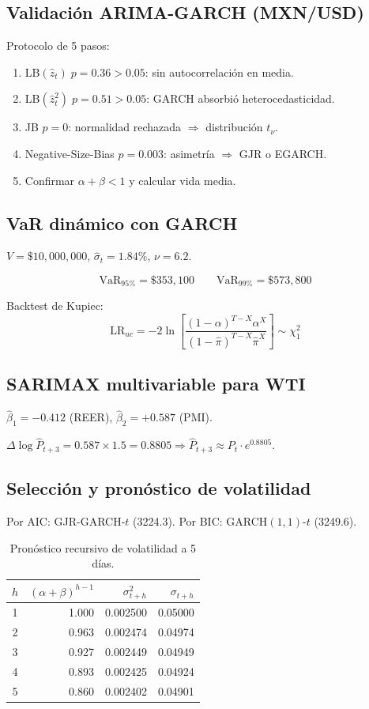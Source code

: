 \documentclass[12pt,letterpaper]{article}
\begin{document}
\subsection{Validaci\'on ARIMA-GARCH (MXN/USD)}

Protocolo de 5 pasos:
\begin{enumerate}
  \item LB$(\hat{z}_t)\;p=0.36>0.05$: sin autocorrelaci\'on en media.
  \item LB$(\hat{z}_t^2)\;p=0.51>0.05$: GARCH absorbi\'o heterocedasticidad.
  \item JB $p=0$: normalidad rechazada $\Rightarrow$ distribuci\'on $t_\nu$.
  \item Negative-Size-Bias $p=0.003$: asimetr\'ia $\Rightarrow$ GJR o EGARCH.
  \item Confirmar $\alpha+\beta<1$ y calcular vida media.
\end{enumerate}

\subsection{VaR din\'amico con GARCH}

$V=\$10{,}000{,}000$, $\hat{\sigma}_t=1.84\%$, $\nu=6.2$.

\[
  \mathrm{VaR}_{95\%}=\$353{,}100 \qquad \mathrm{VaR}_{99\%}=\$573{,}800
\]

Backtest de Kupiec:
\[
  \mathrm{LR}_{uc}=-2\ln\!\left[
    \frac{(1-\alpha)^{T-X}\alpha^X}{(1-\hat{\pi})^{T-X}\hat{\pi}^X}
  \right]\sim\chi^2_1
\]

\subsection{SARIMAX multivariable para WTI}

$\hat{\beta}_1=-0.412$ (REER), $\hat{\beta}_2=+0.587$ (PMI).

$\Delta\log\hat{P}_{t+3}=0.587\times1.5=0.8805
\Rightarrow\hat{P}_{t+3}\approx P_t\cdot e^{0.8805}$.

\subsection{Selecci\'on y pron\'ostico de volatilidad}

Por AIC: GJR-GARCH-$t$ (3224.3). Por BIC: GARCH$(1,1)$-$t$ (3249.6).

\begin{table}[h!]
\centering
\begin{tabular}{@{}crrr@{}}
\toprule
$h$ & $(\alpha{+}\beta)^{h-1}$ & $\sigma_{t+h}^2$ & $\sigma_{t+h}$ \\
\midrule
1 & 1.000 & 0.002500 & 0.05000 \\
2 & 0.963 & 0.002474 & 0.04974 \\
3 & 0.927 & 0.002449 & 0.04949 \\
4 & 0.893 & 0.002425 & 0.04924 \\
5 & 0.860 & 0.002402 & 0.04901 \\
\bottomrule
\end{tabular}
\caption{Pron\'ostico recursivo de volatilidad a 5 d\'ias.}
\end{table}
\end{document}
